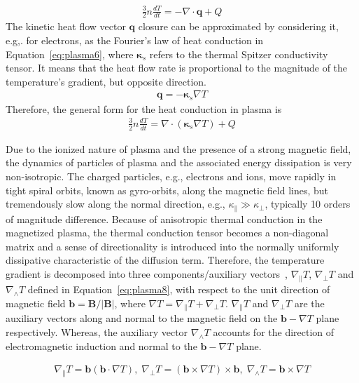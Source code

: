 \documentclass[runningheads]{llncs}
\begin{document}
\begin{eqnarray}
\frac{3}{2}n\frac{dT}{dt} = -\nabla \cdot \bm{q} + Q
\end{eqnarray}  
The kinetic heat flow vector $\bm{q}$ closure can be approximated by considering it, e.g,. for electrons, as the Fourier's law of heat conduction in Equation~\eqref{eq:plasma6}, where $\bm{\kappa}_s$ refers to the thermal Spitzer conductivity tensor. It means that the heat flow rate is proportional to the magnitude of the temperature's gradient, but opposite direction.
\begin{eqnarray}
\bm{q} = -\bm{\kappa}_s \nabla T \label{eq:plasma6}
\end{eqnarray}
Therefore, the general form for the heat conduction in plasma is
\begin{eqnarray}
\frac{3}{2} n \frac{dT}{dt} = \nabla \cdot (\bm{\kappa}_s \nabla T) + Q \label{eq:plasma7}
\end{eqnarray}

Due to the ionized nature of plasma and the presence of a strong magnetic field, the dynamics of particles of plasma and the associated energy dissipation is very non-isotropic. The charged particles, e.g., electrons and ions, move rapidly in tight spiral orbits, known as gyro-orbits, along the magnetic field lines, but tremendously slow along the normal direction, e.g., $\kappa_{\parallel} \gg \kappa_{\perp}$, typically 10 orders of magnitude difference. Because of anisotropic thermal conduction in the magnetized plasma, the thermal conduction tensor becomes a non-diagonal matrix and a sense of directionality is introduced into the normally uniformly dissipative characteristic of the diffusion term. Therefore, the temperature gradient is decomposed into three components/auxiliary vectors~\cite{goedbloed2004principles}, $\nabla_{\parallel} T$, $\nabla_{\perp} T$ and $\nabla_{\wedge} T$ defined in Equation~\eqref{eq:plasma8}, with respect to the unit direction of magnetic field $\bm{b} = \bm{B}/|\bm{B}|$, where $\nabla T = \nabla_{\parallel} T + \nabla_{\perp} T$.
$\nabla_{\parallel} T$ and $\nabla_{\perp} T$ are the auxiliary vectors along and normal to the magnetic field on the $\bm{b}-\nabla T$ plane respectively. Whereas, the auxiliary vector $\nabla_{\wedge} T$ accounts for the direction of electromagnetic induction and normal to the $\bm{b}-\nabla T$ plane.      

\begin{eqnarray}
\nabla_{\parallel} T = \bm{b}(\bm{b}\cdot \nabla T),\; \nabla_{\perp} T = (\bm{b}\times \nabla T)\times \bm{b}, \; \nabla_{\wedge} T = \bm{b} \times \nabla T \label{eq:plasma8}
\end{eqnarray}
\end{document}
